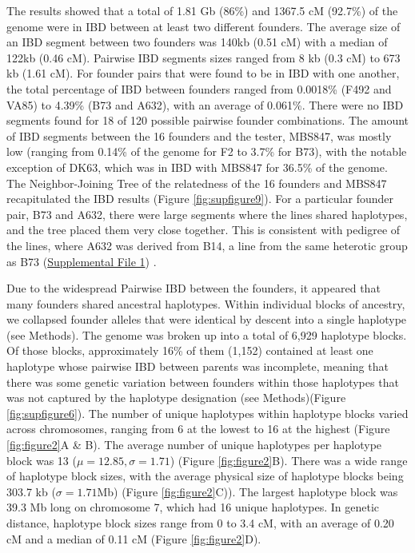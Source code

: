 \documentclass[9pt,twocolumn,twoside]{gsag3jnl}
\begin{document}
The results showed that a total of 1.81 Gb (86\%) and 1367.5 cM (92.7\%) of the genome were in IBD between at least two different founders.
The average size of an IBD segment between two founders was 140kb (0.51 cM) with a median of 122kb (0.46 cM). Pairwise IBD segments sizes ranged from 8 kb (0.3 cM) to  673 kb (1.61 cM).
For founder pairs that were found to be in IBD with one another, the total percentage of IBD between founders ranged from 0.0018\% (F492 and VA85) to 4.39\% (B73 and A632), with an average of 0.061\%.
There were no IBD segments found for 18 of 120 possible pairwise founder combinations.
The amount of IBD segments between the 16 founders and the tester, MBS847, was mostly low (ranging from 0.14\% of the genome for F2 to 3.7\% for B73), with the notable exception of DK63, which was in IBD with MBS847 for 36.5\% of the genome.
The Neighbor-Joining Tree of the relatedness of the 16 founders and MBS847 recapitulated the IBD results (Figure \ref{fig:supfigure9}).
For a particular founder pair, B73 and A632, there were large segments where the lines shared haplotypes, and the tree placed them very close together.
This is consistent with pedigree of the lines, where A632 was derived from B14, a line from the same heterotic group as B73 (\href{run:./figures/Methods_Supplementa1.docx}{Supplemental File 1}) \citep{Lorenz}.

Due to the widespread Pairwise IBD between the founders, it appeared that many founders shared ancestral haplotypes.
Within individual blocks of ancestry, we collapsed founder alleles that were identical by descent into a single haplotype (see Methods).
The genome was broken up into a total of 6,929 haplotype blocks.
Of those blocks, approximately 16\% of them (1,152) contained at least one haplotype whose pairwise IBD between parents was incomplete, meaning that there was some genetic variation between founders within those haplotypes that was not captured by the haplotype designation (see Methods)(Figure \ref{fig:supfigure6}).
The number of unique haplotypes within haplotype blocks varied across chromosomes, ranging from 6 at the lowest to 16 at the highest (Figure  \ref{fig:figure2}A \& B).
The average number of unique haplotypes per haplotype block was 13 ($\mu = 12.85, \sigma =1.71$) (Figure \ref{fig:figure2}B).
There was a wide range of haplotype block sizes, with the average physical size of haplotype blocks being 303.7 kb ($\sigma =1.71$Mb) (Figure \ref{fig:figure2}C)).
The largest haplotype block was 39.3 Mb long on chromosome 7, which had 16 unique haplotypes.
In genetic distance, haplotype block sizes range from 0 to 3.4 cM, with an average of 0.20 cM and a median of 0.11 cM (Figure \ref{fig:figure2}D).
\end{document}
